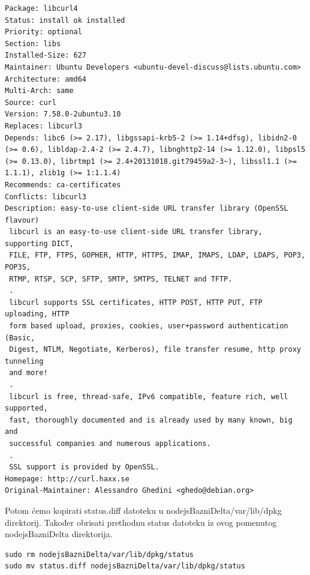 \documentclass[12pt,vi]{mitthesis}
\begin{document}
\begin{lstlisting}[style=BashInputStyle]
Package: libcurl4
Status: install ok installed
Priority: optional
Section: libs
Installed-Size: 627
Maintainer: Ubuntu Developers <ubuntu-devel-discuss@lists.ubuntu.com>
Architecture: amd64
Multi-Arch: same
Source: curl
Version: 7.58.0-2ubuntu3.10
Replaces: libcurl3
Depends: libc6 (>= 2.17), libgssapi-krb5-2 (>= 1.14+dfsg), libidn2-0 (>= 0.6), libldap-2.4-2 (>= 2.4.7), libnghttp2-14 (>= 1.12.0), libpsl5 (>= 0.13.0), librtmp1 (>= 2.4+20131018.git79459a2-3~), libssl1.1 (>= 1.1.1), zlib1g (>= 1:1.1.4)
Recommends: ca-certificates
Conflicts: libcurl3
Description: easy-to-use client-side URL transfer library (OpenSSL flavour)
 libcurl is an easy-to-use client-side URL transfer library, supporting DICT,
 FILE, FTP, FTPS, GOPHER, HTTP, HTTPS, IMAP, IMAPS, LDAP, LDAPS, POP3, POP3S,
 RTMP, RTSP, SCP, SFTP, SMTP, SMTPS, TELNET and TFTP.
 .
 libcurl supports SSL certificates, HTTP POST, HTTP PUT, FTP uploading, HTTP
 form based upload, proxies, cookies, user+password authentication (Basic,
 Digest, NTLM, Negotiate, Kerberos), file transfer resume, http proxy tunneling
 and more!
 .
 libcurl is free, thread-safe, IPv6 compatible, feature rich, well supported,
 fast, thoroughly documented and is already used by many known, big and
 successful companies and numerous applications.
 .
 SSL support is provided by OpenSSL.
Homepage: http://curl.haxx.se
Original-Maintainer: Alessandro Ghedini <ghedo@debian.org>
\end{lstlisting}
\indent
Potom ćemo kopirati status.diff datoteku u nodejsBazniDelta/var/lib/dpkg direktorij. Također obrisati prethodnu status datoteku iz ovog pomenutog nodejsBazniDelta direktorija.\\
\begin{lstlisting}[style=BashInputStyle]
sudo rm nodejsBazniDelta/var/lib/dpkg/status
sudo mv status.diff nodejsBazniDelta/var/lib/dpkg/status
\end{lstlisting}
\end{document}

